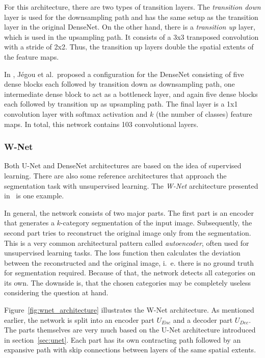 For this architecture, there are two types of transition layers. The \emph{transition down} layer is used for the downsampling path and has the same setup as the transition layer in the original DenseNet. On the other hand, there is a \emph{transition up} layer, which is used in the upsampling path. It consists of a 3x3 transposed convolution with a stride of 2x2. Thus, the transition up layers double the spatial extents of the feature maps.

In \cite{denseseg17}, Jégou et al.\ proposed a configuration for the DenseNet consisting of five dense blocks each followed by transition down as downsampling path, one intermediate dense block to act as a bottleneck layer, and again five dense blocks each followed by transition up as upsampling path. The final layer is a 1x1 convolution layer with softmax activation and $k$ (the number of classes) feature maps. In total, this network contains 103 convolutional layers.

\subsubsection{W-Net}
\label{sec:w-net}
Both U-Net and DenseNet architectures are based on the idea of supervised learning. There are also some reference architectures that approach the segmentation task with unsupervised learning. The \emph{W-Net} architecture presented in~\cite{wnet17} is one example.

In general, the network consists of two major parts. The first part is an encoder that generates a $k$-category segmentation of the input image. Subsequently, the second part tries to reconstruct the original image only from the segmentation. This is a very common architectural pattern called \emph{autoencoder}, often used for unsupervised learning tasks. The loss function then calculates the deviation between the reconstructed and the original image, i.~e. there is no ground truth for segmentation required. Because of that, the network detects all categories on its own. The downside is, that the chosen categories may be completely useless considering the question at hand.

Figure~\ref{fig:wnet_architecture} illustrates the W-Net architecture. As mentioned earlier, the network is split into an encoder part $U_{Enc}$ and a decoder part $U_{Dec}$. The parts themselves are very much based on the U-Net architecture introduced in section~\ref{sec:unet}. Each part has its own contracting path followed by an expansive path with skip connections between layers of the same spatial extents.

